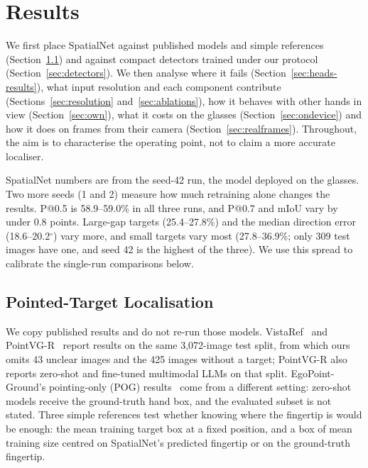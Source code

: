 \section{Results}\label{sec:results}

We first place SpatialNet against published models and simple references (Section~\ref{sec:main}) and against compact detectors trained under our protocol (Section~\ref{sec:detectors}). We then analyse where it fails (Section~\ref{sec:heads-results}), what input resolution and each component contribute (Sections~\ref{sec:resolution} and~\ref{sec:ablations}), how it behaves with other hands in view (Section~\ref{sec:own}), what it costs on the glasses (Section~\ref{sec:ondevice}) and how it does on frames from their camera (Section~\ref{sec:realframes}). Throughout, the aim is to characterise the operating point, not to claim a more accurate localiser.

SpatialNet numbers are from the seed-42 run, the model deployed on the glasses. Two more seeds (1 and 2) measure how much retraining alone changes the results. P@0.5 is 58.9--59.0\% in all three runs, and P@0.7 and mIoU vary by under 0.8 points. Large-gap targets (25.4--27.8\%) and the median direction error (18.6--20.2$^\circ$) vary more, and small targets vary most (27.8--36.9\%; only 309 test images have one, and seed 42 is the highest of the three). We use this spread to calibrate the single-run comparisons below.

\subsection{Pointed-Target Localisation}\label{sec:main}

We copy published results and do not re-run those models. VistaRef~\cite{li2026vistaref} and PointVG-R~\cite{li2026pointvgr} report results on the same 3,072-image test split, from which ours omits 43 unclear images and the 425 images without a target; PointVG-R also reports zero-shot and fine-tuned multimodal LLMs on that split. EgoPoint-Ground's pointing-only (POG) results~\cite{egopoint} come from a different setting: zero-shot models receive the ground-truth hand box, and the evaluated subset is not stated. Three simple references test whether knowing where the fingertip is would be enough: the mean training target box at a fixed position, and a box of mean training size centred on SpatialNet's predicted fingertip or on the ground-truth fingertip.

